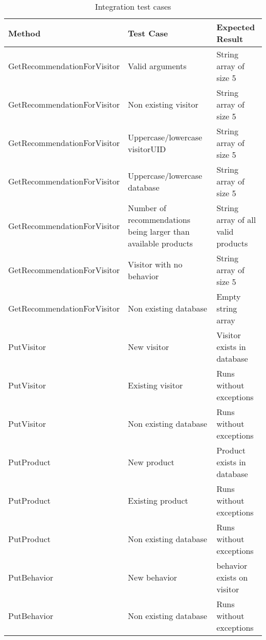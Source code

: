 \begin{table}[H]
\centering
\caption{Integration test cases}
\label{testCases}
\begin{tabular}{|p{6cm}|p{5cm}|p{5cm}|}
\hline
\textbf{Method}             & \textbf{Test Case}                                             & \textbf{Expected Result}           \\ \hline
GetRecommendationForVisitor & Valid arguments                                                & String array of size 5             \\ \hline
GetRecommendationForVisitor & Non existing visitor                                           & String array of size 5             \\ \hline
GetRecommendationForVisitor & Uppercase/lowercase visitorUID                                 & String array of size 5             \\ \hline
GetRecommendationForVisitor & Uppercase/lowercase database                                   & String array of size 5             \\ \hline
GetRecommendationForVisitor & Number of recommendations being larger than available products & String array of all valid products \\ \hline
GetRecommendationForVisitor & Visitor with no behavior                                       & String array of size 5             \\ \hline
GetRecommendationForVisitor & Non existing database                                          & Empty string array                 \\ \hline
PutVisitor                  & New visitor                                                    & Visitor exists in database         \\ \hline
PutVisitor                  & Existing visitor                                               & Runs without exceptions            \\ \hline
PutVisitor                  & Non existing database                                          & Runs without exceptions            \\ \hline
PutProduct                  & New product                                                    & Product exists in database         \\ \hline
PutProduct                  & Existing product                                               & Runs without exceptions            \\ \hline
PutProduct                  & Non existing database                                          & Runs without exceptions            \\ \hline
PutBehavior                 & New behavior                                                   & behavior exists on visitor         \\ \hline
PutBehavior                 & Non existing database                                          & Runs without exceptions            \\ \hline
\end{tabular}
\end{table}

